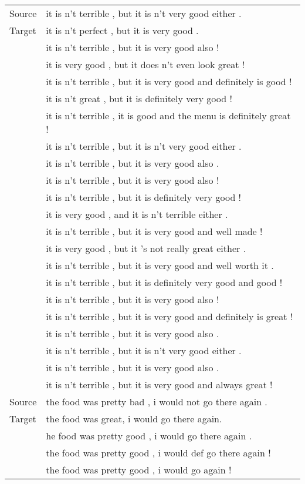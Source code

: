 \documentclass[11pt]{article}
\begin{document}
\begin{table}[ht]
\begin{tabular}{l|l}
\midrule[1pt]
Source&it is n't terrible , but it is n't very good either .\\
Target&it is n't perfect , but it is very good .\\\midrule
&it is n't terrible , but it is very good also !\\
&it is very good , but it does n't even look great !\\
&it is n't terrible , but it is very good and definitely is good !\\
&it is n't great , but it is definitely very good !\\
&it is n't terrible , it is good and the menu is definitely great !\\
&it is n't terrible , but it is n't very good either .\\
&it is n't terrible , but it is very good also .\\
&it is n't terrible , but it is very good also !\\
&it is n't terrible , but it is definitely very good !\\
&it is very good , and it is n't terrible either .\\
&it is n't terrible , but it is very good and well made !\\
&it is very good , but it 's not really great either .\\
&it is n't terrible , but it is very good and well worth it .\\
&it is n't terrible , but it is definitely very good and good !\\
&it is n't terrible , but it is very good also !\\
&it is n't terrible , but it is very good and definitely is great !\\
&it is n't terrible , but it is very good also .\\
&it is n't terrible , but it is n't very good either .\\
&it is n't terrible , but it is very good also .\\
&it is n't terrible , but it is very good and always great !\\
\midrule[1pt]
Source&the food was pretty bad , i would not go there again .\\
Target&the food was great, i would go there again.\\\midrule
&he food was pretty good , i would go there again .\\
&the food was pretty good , i would def go there again !\\
&the food was pretty good , i would go again !\\

\end{tabular}
\end{table}
\end{document}
